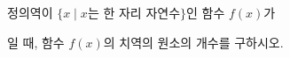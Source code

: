 \hspace*{2mm}\begin{minipage}[t]{\dimexpr\linewidth-2mm\relax}\vspace{0pt}
정의역이 $\{x \mid x$는 한 자리 자연수$\}$인 함수 $f(x)$가\par\smallskip{}\par\smallskip\noindent 일 때, 함수 $f(x)$의 치역의 원소의 개수를 구하시오.\end{minipage}
